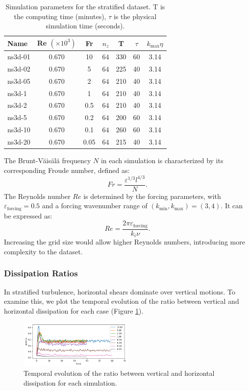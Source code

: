 \documentclass[final,5p,times,twocolumn,authoryear]{elsarticle}
\begin{document}
\begin{table}[h]
\centering
\renewcommand{\arraystretch}{1.5}
\begin{tabularx}{0.48\textwidth}{l c c c c c c } 
 \hline
 Name & Re $\left(\times 10^3\right)$ & Fr & $n_z$ & T & $\tau$ & $k_{\text{max}} \eta$ \\
 \hline \hline
 ns3d-01 & 0.670 & 10 & $64$ & 330 & 60 & 3.14 \\
 ns3d-02 & 0.670 & 5 & $64$ & 225 & 40 & 3.14 \\
 ns3d-05 & 0.670 & 2 & $64$ & 210 & 40 & 3.14 \\
 ns3d-1 & 0.670 & 1 & $64$ & 210 & 40 & 3.14 \\
 ns3d-2 & 0.670 & 0.5 & $64$ & 210 & 40 & 3.14 \\
 ns3d-5 & 0.670 & 0.2 & $64$ & 200 & 60 & 3.14 \\
 ns3d-10 & 0.670 & 0.1 & $64$ & 260 & 60 & 3.14 \\ 
 ns3d-20 & 0.670 & 0.05 & $64$ & 215 & 40 & 3.14 \\ 
 \hline
\end{tabularx}
\caption{Simulation parameters for the stratified dataset. T is the computing time (minutes), $\tau$ is the physical simulation time (seconds).}
\label{Table1}
\end{table}

The Brunt-Väisälä frequency $N$ in each simulation is characterized by its corresponding Froude number, defined as:
\begin{equation*}
    Fr = \frac{\varepsilon^{1/3} l^{4/3}}{N}.
\end{equation*}
The Reynolds number $Re$ is determined by the forcing parameters, with $\varepsilon_{\text{forcing}} = 0.5$ and a forcing wavenumber range of $(k_{\text{min}}, k_{\text{max}}) = (3,4)$. It can be expressed as:
\begin{equation*}
    Re = \frac{2 \pi \varepsilon_{\text{forcing}}}{k_i \nu}.
\end{equation*}
Increasing the grid size would allow higher Reynolds numbers, introducing more complexity to the dataset.

\subsubsection{Dissipation Ratios}

In stratified turbulence, horizontal shears dominate over vertical motions. To examine this, we plot the temporal evolution of the ratio between vertical and horizontal dissipation for each case (Figure \ref{fig:kzkh dissipation}). 
\begin{figure}[h]
	\centering
	\includegraphics[width=0.5\textwidth]{fig/kzkhdissipation.png}
	\caption{Temporal evolution of the ratio between vertical and horizontal dissipation for each simulation.} 
	\label{fig:kzkh dissipation}
\end{figure}
\end{document}
